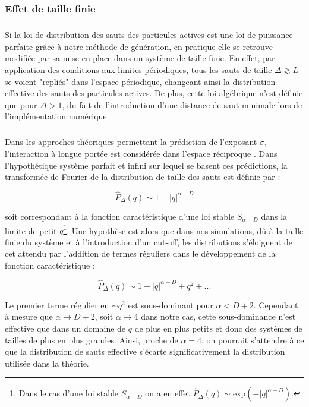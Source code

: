 \subsubsection{Effet de taille finie}

\subparagraph{}Si la loi de distribution des sauts des particules actives est une loi de puissance parfaite grâce à notre méthode de génération, en pratique elle se retrouve modifiée par sa mise en place dans un système de taille finie. En effet, par application des conditions aux limites périodiques, tous les sauts de taille $\Delta \gtrsim L$ se voient "repliés" dans l'espace périodique, changeant ainsi la distribution effective des sauts des particules actives. De plus, cette loi algébrique n'est définie que pour $\Delta>1$, du fait de l'introduction d'une distance de saut minimale lors de l'implémentation numérique.

\subparagraph{}Dans les approches théoriques permettant la prédiction de l'exposant $\sigma$, l'interaction à longue portée est considérée dans l'espace réciproque \cite{wiese_longrange}. Dans l'hypothétique système parfait et infini sur lequel se basent ces prédictions, la transformée de Fourier de la distribution de taille des sauts est définie par :

\begin{equation}
	\hat{P}_\Delta(q) \sim 1-|q|^{\alpha-D}
\end{equation}

\noindent soit correspondant à la fonction caractéristique d'une loi stable $S_{\alpha-D}$ dans la limite de petit $q$\footnote{Dans le cas d'une loi stable $S_{\alpha-D}$ on a en effet $\hat{P}_\Delta(q) \sim \text{exp}\left( -|q|^{\alpha-D} \right)$.}. Une hypothèse est alors que dans nos simulations, dû à la taille finie du système et à l'introduction d'un cut-off, les distributions s'éloignent de cet attendu par l'addition de termes réguliers dans le développement de la fonction caractéristique :

\begin{equation}
	\hat{P}_\Delta(q) \sim 1-|q|^{\alpha-D} + q^2 + ...
	\label{eq:DevStable}
\end{equation}

\noindent Le premier terme régulier en $\sim q^2$ est sous-dominant pour $\alpha < D+2$. Cependant à mesure que $\alpha \rightarrow D+2$, soit $\alpha\rightarrow 4$ dans notre cas, cette sous-dominance n'est effective que dans un domaine de $q$ de plus en plus petits et donc des systèmes de tailles de plus en plus grandes. Ainsi, proche de $\alpha = 4$, on pourrait s'attendre à ce que la distribution de sauts effective s'écarte significativement la distribution utilisée dans la théorie.

